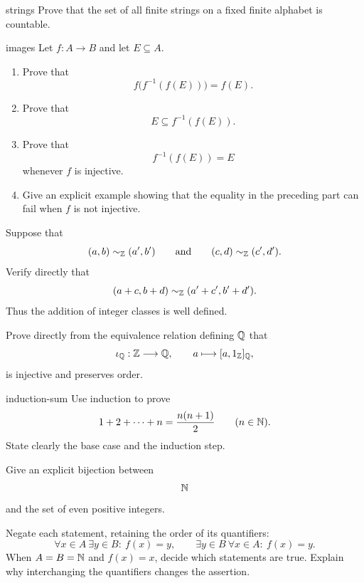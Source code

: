 \begin{hexercise}{strings}
Prove that the set of all finite strings on a fixed finite alphabet is countable.
\end{hexercise}

\begin{hexercise}{images}
Let $f:A\to B$ and let $E\subseteq A$.
\begin{enumerate}
\item Prove that
\[
f\bigl(f^{-1}(f(E))\bigr)=f(E).
\]
\item Prove that
\[
E\subseteq f^{-1}(f(E)).
\]
\item Prove that
\[
f^{-1}(f(E))=E
\]
whenever $f$ is injective.
\item Give an explicit example showing that the equality in the preceding part
can fail when $f$ is not injective.
\end{enumerate}
\end{hexercise}

\begin{exercise}
Suppose that
\[
(a,b)\sim_{\mathbb{Z}}(a',b')
\qquad\text{and}\qquad
(c,d)\sim_{\mathbb{Z}}(c',d').
\]
Verify directly that
\[
(a+c,b+d)\sim_{\mathbb{Z}}(a'+c',b'+d').
\]
Thus the addition of integer classes is well defined.
\end{exercise}

\begin{exercise}
Prove directly from the equivalence relation defining \(\mathbb{Q}\) that
\[
\iota_{\mathbb{Q}}:\mathbb{Z}\longrightarrow\mathbb{Q},
\qquad
a\longmapsto[a,1_{\mathbb{Z}}]_{\mathbb{Q}},
\]
is injective and preserves order.
\end{exercise}

\begin{hexercise}{induction-sum}
Use induction to prove
\[
1+2+\cdots+n=\frac{n(n+1)}{2}
\qquad(n\in\mathbb{N}).
\]
State clearly the base case and the induction step.
\end{hexercise}

\begin{exercise}
Give an explicit bijection between
\[
\mathbb{N}
\]
and the set of even positive integers.
\end{exercise}

\begin{exercise}
Negate each statement, retaining the order of its quantifiers:
\[
\forall x\in A\ \exists y\in B:\ f(x)=y,
\qquad
\exists y\in B\ \forall x\in A:\ f(x)=y.
\]
When $A=B=\mathbb{N}$ and $f(x)=x$, decide which statements are true. Explain
why interchanging the quantifiers changes the assertion.
\end{exercise}
